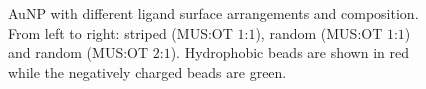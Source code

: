 \begin{figure}[!ht]
	\centering
	\qquad
	\qquad
	\caption{Au\acs{NP} with different ligand surface arrangements and composition. From left to right: striped (\ac{MUS}:\ac{OT} $1$:$1$), random (\ac{MUS}:\ac{OT} $1$:$1$) and random (\ac{MUS}:\ac{OT} $2$:$1$). Hydrophobic beads are shown in red while the negatively charged beads are green.}%
	\label{fig:coating}
\end{figure}

